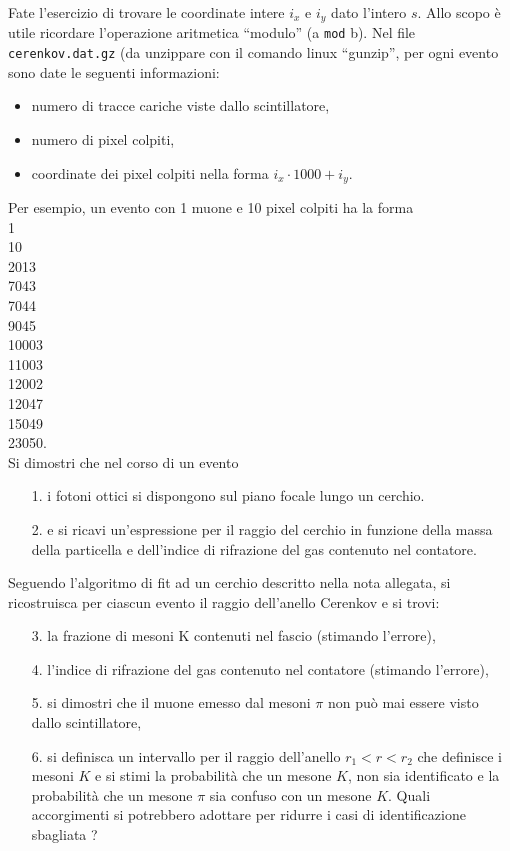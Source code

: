 \documentclass[a4paper,9pt]{article}
\begin{document}
Fate l'esercizio di trovare le coordinate intere $i_x$ e $i_y$ dato l'intero $s$. Allo scopo \`e utile ricordare l'operazione 
aritmetica ``modulo'' (a \texttt{mod} b). Nel file \texttt{cerenkov.dat.gz} (da unzippare con il comando linux ``gunzip'', 
per ogni evento sono date le seguenti informazioni:
\begin{itemize}
\item numero di tracce cariche viste dallo scintillatore,
\item numero di pixel colpiti,
\item coordinate dei pixel colpiti nella forma $i_x \cdot 1000 + i_y$.
\end{itemize}
Per esempio, un evento con 1 muone e 10 pixel colpiti ha la forma\\
1\\ 
10\\ 
2013\\
7043\\
7044\\ 
9045\\ 
10003\\ 
11003\\ 
12002\\ 
12047\\ 
15049\\ 
23050.\\

\noindent
Si dimostri che nel corso di un evento
\begin{enumerate}
\item[1.] i fotoni ottici si dispongono sul piano focale lungo un cerchio.
\item[2.] e si ricavi un'espressione per il raggio del cerchio in funzione della massa della particella e dell'indice di rifrazione del gas contenuto nel contatore.
\end{enumerate}
Seguendo l'algoritmo di fit ad un cerchio descritto nella nota allegata, si ricostruisca per ciascun evento il raggio dell'anello Cerenkov e si trovi:
\begin{enumerate}
\item[3.] la frazione di mesoni K contenuti nel fascio (stimando l'errore),
\item[4.] l'indice di rifrazione del gas contenuto nel contatore (stimando l'errore),
\item[5.] si dimostri che il muone emesso dal mesoni $\pi$ non pu\`o mai essere visto dallo scintillatore,
\item[6.] si definisca un intervallo per il raggio dell'anello $r_1 < r < r_2$ che definisce i mesoni $K$ e si stimi la probabilit\`a che un mesone $K$, 
  non sia identificato e la probabilit\`a che un mesone $\pi$ sia confuso con un mesone $K$. Quali accorgimenti si potrebbero adottare per ridurre 
i casi di identificazione sbagliata ?
\end{enumerate}


\thispagestyle{empty} %
\end{document}
